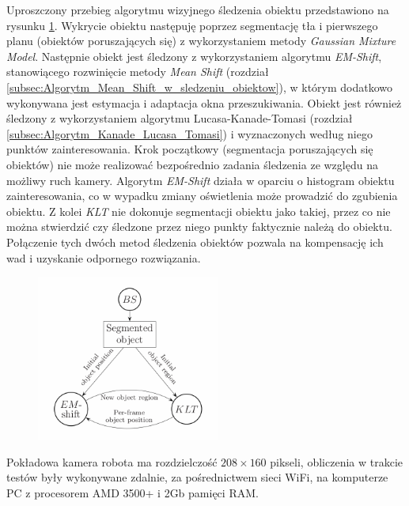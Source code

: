 {Uproszczony przebieg algorytmu wizyjnego śledzenia obiektu przedstawiono na rysunku \ref{fig:Przebieg_algorytmu_Liem}. Wykrycie obiektu następuję poprzez segmentację tła i pierwszego planu (obiektów poruszających się) z wykorzystaniem metody \textit{Gaussian Mixture Model}. Następnie obiekt jest śledzony z wykorzystaniem algorytmu \textit{EM-Shift}, stanowiącego rozwinięcie metody \textit{Mean Shift} (rozdział \ref{subsec:Algorytm_Mean_Shift_w_sledzeniu_obiektow}), w którym dodatkowo wykonywana jest estymacja i adaptacja okna przeszukiwania. Obiekt jest również śledzony z wykorzystaniem algorytmu Lucasa-Kanade-Tomasi (rozdział \ref{subsec:Algorytm_Kanade_Lucasa_Tomasi}) i wyznaczonych według niego punktów zainteresowania. Krok początkowy (segmentacja poruszających się obiektów) nie może realizować bezpośrednio zadania śledzenia ze względu na możliwy ruch kamery. Algorytm \textit{EM-Shift} działa w oparciu o histogram obiektu zainteresowania, co w wypadku zmiany oświetlenia może prowadzić do zgubienia obiektu. Z kolei \textit{KLT} nie dokonuje segmentacji obiektu jako takiej, przez co nie można stwierdzić czy śledzone przez niego punkty faktycznie należą do obiektu. Połączenie tych dwóch metod śledzenia obiektów pozwala na kompensację ich wad i uzyskanie odpornego rozwiązania.
\begin{figure}[!htb]
	\begin{center}
		\includegraphics[width=6cm]{images/algorithm_liem.png}
	\end{center}	
\label{fig:Przebieg_algorytmu_Liem}
\end{figure}

Pokładowa kamera robota ma rozdzielczość $208 \times 160$ pikseli, obliczenia w trakcie testów były wykonywane zdalnie, za pośrednictwem sieci WiFi, na komputerze PC z procesorem AMD 3500+ i 2Gb pamięci RAM.

}

